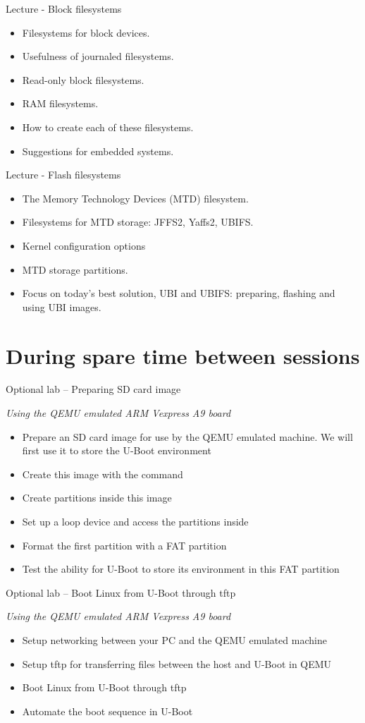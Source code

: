 \documentclass[a4paper,12pt,obeyspaces,spaces,hyphens]{article}
\begin{document}
\feagendaonecolumn
{Lecture - Block filesystems}
{
  \begin{itemize}
  \item Filesystems for block devices.
  \item Usefulness of journaled filesystems.
  \item Read-only block filesystems.
  \item RAM filesystems.
  \item How to create each of these filesystems.
  \item Suggestions for embedded systems.
  \end{itemize}
}

\feagendaonecolumn
{Lecture - Flash filesystems}
{
  \begin{itemize}
  \item The Memory Technology Devices (MTD) filesystem.
  \item Filesystems for MTD storage: JFFS2, Yaffs2, UBIFS.
  \item Kernel configuration options
  \item MTD storage partitions.
  \item Focus on today's best solution, UBI and UBIFS:
	preparing, flashing and using UBI images.
  \end{itemize}
}

\section{During spare time between sessions}

\feagendaonecolumn
{Optional lab – Preparing SD card image}
{
  {\em Using the QEMU emulated ARM Vexpress A9 board}
  \begin{itemize}
  \item Prepare an SD card image for use by the QEMU emulated machine.
        We will first use it to store the U-Boot environment
  \item Create this image with the  command
  \item Create partitions inside this image
  \item Set up a loop device and access the partitions inside
  \item Format the first partition with a FAT partition
  \item Test the ability for U-Boot to store its environment in
        this FAT partition
  \end{itemize}
}

\feagendaonecolumn
{Optional lab – Boot Linux from U-Boot through tftp}
{
  {\em Using the QEMU emulated ARM Vexpress A9 board}
  \begin{itemize}
  \item Setup networking between your PC and the QEMU emulated machine
  \item Setup tftp for transferring files between the host and U-Boot
        in QEMU
  \item Boot Linux from U-Boot through tftp
  \item Automate the boot sequence in U-Boot
  \end{itemize}
}
\end{document}
